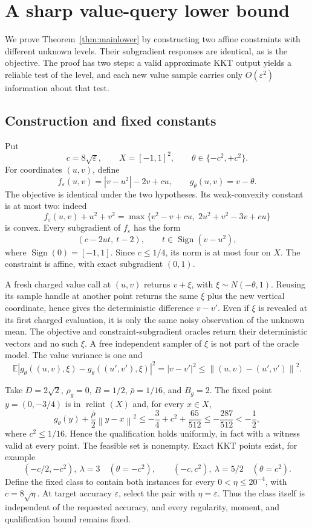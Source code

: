 \documentclass[11pt,a4paper]{article}
\newcommand{\E}{\mathbb E}
\newcommand{\eps}{\varepsilon}
\newcommand{\norm}[1]{\left\lVert#1\right\rVert}
\theoremstyle{remark}
\numberwithin{equation}{section}
\begin{document}
\section{A sharp value-query lower bound}\label{sec:lower}
We prove Theorem~\ref{thm:mainlower} by constructing two affine constraints with different unknown levels. Their subgradient responses are identical, as is the objective. The proof has two steps: a valid approximate KKT output yields a reliable test of the level, and each new value sample carries only $O(\eps^2)$ information about that test.


\subsection{Construction and fixed constants}
Put
\[
 c=8\sqrt\eps,\qquad X=[-1,1]^2,\qquad
 \theta\in\{-c^2,+c^2\}.
\]
For coordinates $(u,v)$, define
\begin{equation}
 f_\eps(u,v)=|v-u^2|-2v+cu,
 \qquad g_\theta(u,v)=v-\theta.
 \label{eq:hardfamily}
\end{equation}
The objective is identical under the two hypotheses. Its weak-convexity constant is at most two: indeed
\[
 f_\eps(u,v)+u^2+v^2
 =\max\{v^2-v+cu,\;2u^2+v^2-3v+cu\}
\]
is convex. Every subgradient of $f_\eps$ has the form
\begin{equation}
 (c-2ut,\ t-2),\qquad
 t\in\operatorname{Sign}(v-u^2),
 \label{eq:subgrad}
\end{equation}
where $\operatorname{Sign}(0)=[-1,1]$. Since $c\le1/4$, its norm is at most four on $X$. The constraint is affine, with exact subgradient $(0,1)$.

A fresh charged value call at $(u,v)$ returns $v+\xi$, with $\xi\sim N(-\theta,1)$. Reusing its sample handle at another point returns the same $\xi$ plus the new vertical coordinate, hence gives the deterministic difference $v-v'$. Even if $\xi$ is revealed at its first charged evaluation, it is only the same noisy observation of the unknown mean. The objective and constraint-subgradient oracles return their deterministic vectors and no such $\xi$. A free independent sampler of $\xi$ is not part of the oracle model. The value variance is one and
\[
 \E|g_\theta((u,v),\xi)-g_\theta((u',v'),\xi)|^2
 =|v-v'|^2\le\norm{(u,v)-(u',v')}^2.
\]

Take $D=2\sqrt2$, $\rho_g=0$, $B=1/2$, $\bar\rho=1/16$, and $B_g=2$. The fixed point $y=(0,-3/4)$ is in $\operatorname{relint}(X)$ and, for every $x\in X$,
\[
 g_\theta(y)+\frac{\bar\rho}{2}\norm{y-x}^2
 \le-\frac34+c^2+\frac{65}{512}
 \le-\frac{287}{512}<-\frac12,
\]
where $c^2\le1/16$. Hence the qualification holds uniformly, in fact with a witness valid at every point. The feasible set is nonempty. Exact KKT points exist, for example
\[
 (-c/2,-c^2),\ \lambda=3\quad(\theta=-c^2),
 \qquad
 (-c,c^2),\ \lambda=5/2\quad(\theta=c^2).
\]
Define the fixed class to contain both instances for every $0<\eta\le20^{-4}$, with $c=8\sqrt\eta$. At target accuracy $\eps$, select the pair with $\eta=\eps$. Thus the class itself is independent of the requested accuracy, and every regularity, moment, and qualification bound remains fixed.
\end{document}
